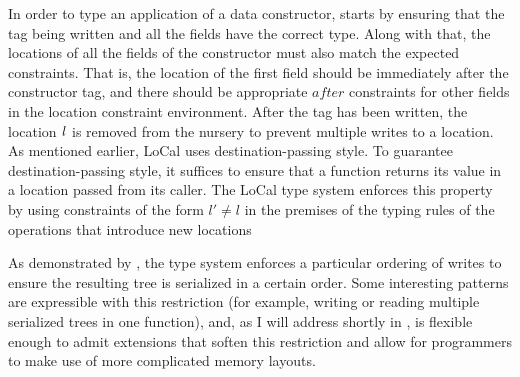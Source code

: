 

In order to type an application of a data constructor, \textsc{\tdatacon} starts by
ensuring that the tag being written and all the fields have the correct type.
Along with that, the locations of all the fields of the constructor must
also match the expected constraints. That is, the location of the first field
should be immediately after the constructor tag, and there should be
appropriate $\mathit{after}$ constraints for other fields in the location constraint environment.
After the tag has been written, the location $\mathit{l}$ is removed from the
nursery to prevent multiple writes to a location.
%
{
%
As mentioned earlier, LoCal uses destination-passing style. To guarantee destination-passing
style, it suffices to ensure that a function returns its value in a location passed from its caller.
The LoCal type system enforces this property by using constraints of the form $l' \neq l$ in the premises
of the typing rules of the operations that introduce new locations
}

{As demonstrated by \textsc{\tdatacon}, the type system enforces a
  particular ordering of writes to ensure the resulting tree is
  serialized in a certain order. Some interesting patterns are
  expressible with this restriction (for example, writing or reading
  multiple serialized trees in one function), and, as I will address
  shortly in , \ourcalc is flexible enough
  to admit extensions that soften this restriction and allow for
  programmers to make use of more complicated memory layouts.}

